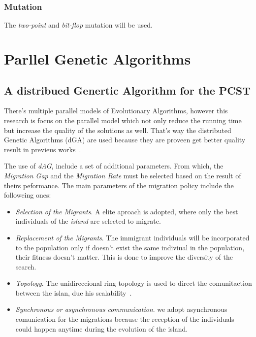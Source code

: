\documentclass[10pt, conference, compsocconf]{IEEEtran}
\begin{document}
\subsubsection{Mutation}
The {\em two-point} and {\em bit-flop} mutation will be used.


\section{Parllel Genetic Algorithms}

\subsection{A distribued Genertic Algorithm for the PCST}

There's multiple parallel models of Evolutionary Algorithms, however this research is focus on the parallel model which not only reduce the running time but increase the quality of the solutions as well. That's way the {distributed Genetic Algorithms} (dGA) are used because they are proveen get better quality result in previeus works~\cite{94044, 658089, 590911, 543253}. 

The use of {\em dAG}, include a set of additional parameters. From which, the {\em Migration Gap} and the {\em Migration Rate} must be selected based on the result of theirs peformance. The main parameters of the migration policy include the followeing ones: 


\begin{itemize}
  \item {\em Selection of the Migrants}. A elite aproach is adopted, where only the best individuals of the {\em island} are selected to migrate. 

  \item {\em Replacement of the Migrants}.  The immigrant individuals will be incorporated to the population only if doesn't exist the same indiviual in the population, their fitness doesn't  matter. This is done to improve the diversity of the search.

  \item {\em Topology}. The unidireccional ring topology is used to direct the comunitaction between the islan, due his scalability~\cite{Cantu-Paz97predictingspeedups}. \\

  \item {\em Synchronous or asynchronous communication}. we adopt asynchronous comunication for the migrations because the reception of the individuals could happen anytime during the evolution of the island.
\end{itemize}
\end{document}
